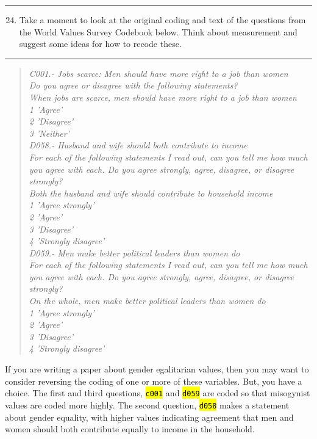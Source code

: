 \documentclass{tufte-handout}
\begin{document}
\bigskip
\hrule
\bigskip

\begin{enumerate}[leftmargin=.5in]
\setcounter{enumi}{23}
	\item Take a moment to look at the original coding and text of the questions from the World Values Survey Codebook below. Think about measurement and suggest some ideas for how to recode these.
\end{enumerate}

\bigskip
\hrule
\bigskip

\begin{quote}
{\em
C001.- Jobs scarce: Men should have more right to a job than women\\
Do you agree or disagree with the following statements?\\
When jobs are scarce, men should have more right to a job than women\\
1 'Agree'\\
2 'Disagree'\\
3 'Neither'\\ \medskip
D058.- Husband and wife should both contribute to income\\
For each of the following statements I read out, can you tell me how much you agree with each. Do you agree strongly, agree, disagree, or disagree strongly?\\
Both the husband and wife should contribute to household income\\
1 'Agree strongly'\\
2 'Agree'\\
3 'Disagree'\\
4 'Strongly disagree'\\ \medskip
D059.- Men make better political leaders than women do\\
For each of the following statements I read out, can you tell me how much you agree with each. Do you agree strongly, agree, disagree, or disagree strongly?\\
On the whole, men make better political leaders than women do\\
1 'Agree strongly'\\
2 'Agree'\\
3 'Disagree'\\
4 'Strongly disagree'}\\
\end{quote}

\medskip
{}
\medskip

If you are writing a paper about gender egalitarian values, then you may want to consider reversing the coding of one or more of these variables. But, you have a choice. The first and third questions, {\tt \hl{c001}} and {\tt \hl{d059}} are coded so that misogynist values are coded more highly. The second question, {\tt \hl{d058}} makes a statement about gender equality, with higher values indicating agreement that men and women should both contribute equally to income in the household. 
\end{document}
